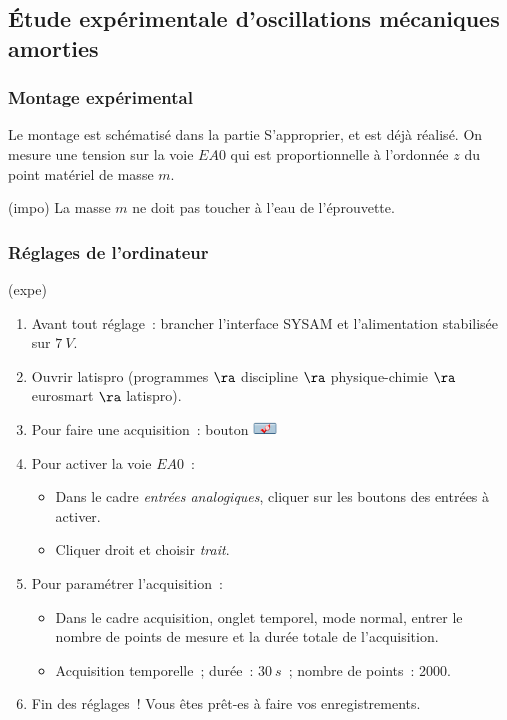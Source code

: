 \documentclass[../main/main.tex]{subfiles}
\begin{document}
\subsection{Étude expérimentale d'oscillations mécaniques amorties}

\subsubsection{Montage expérimental}

Le montage est schématisé dans la partie S'approprier, et est déjà réalisé. On
mesure une tension sur la voie $EA0$ qui est proportionnelle à l'ordonnée $z$ du
point matériel de masse $m$.
\begin{tcb}(impo){}
	La masse $m$ ne doit pas toucher à l'eau de l'éprouvette.
\end{tcb}

\subsubsection{Réglages de l'ordinateur}

\begin{tcb}[breakable](expe){}
	\begin{enumerate}
		\item Avant tout réglage~: brancher l'interface SYSAM et l'alimentation
		      stabilisée sur $\SI{7}{V}$.
		\item Ouvrir latispro (programmes $\ra$ discipline $\ra$ physique-chimie
		      $\ra$ eurosmart $\ra$ latispro).
		\item Pour faire une acquisition~: bouton
		      \includegraphics[width=0.05\textwidth]{bouton_acq}
		\item Pour activer la voie $EA0$~:
		      \begin{itemize}
			      \item Dans le cadre \textit{entrées analogiques}, cliquer sur les
			            boutons des entrées à activer.
			      \item Cliquer droit et choisir \textit{trait}.
		      \end{itemize}
		\item Pour paramétrer l'acquisition~:
		      \begin{itemize}
			      \item Dans le cadre acquisition, onglet temporel, mode normal,
			            entrer le nombre de points de mesure et la durée totale de
			            l'acquisition.
			      \item Acquisition temporelle~; durée~: $\SI{30}{s}$~; nombre de
			            points~: 2000.
		      \end{itemize}
		\item Fin des réglages~! Vous êtes prêt-es à faire vos enregistrements.
	\end{enumerate}
\end{tcb}
\end{document}
